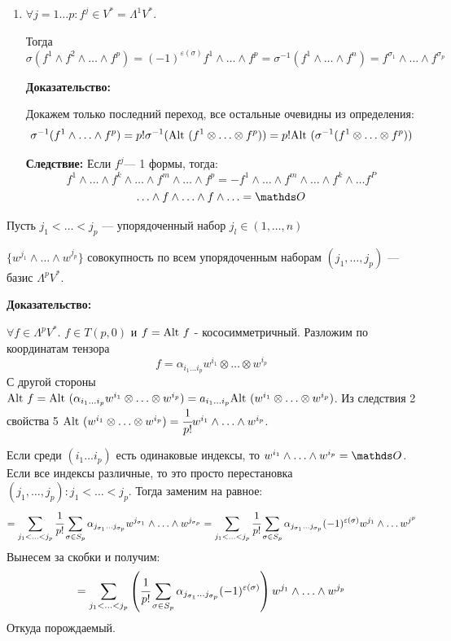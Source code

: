 \begin{enumerate}
    \item $\forall j=1\ldots p : f^j \in V^*= \Lambda^1V^*$.

    Тогда $$\sigma(f^1 \wedge f^2 \wedge \ldots\wedge  f^p) = (-1)^{\varepsilon(\sigma)}f^1\wedge \ldots \wedge f^p = \sigma^{-1}(f^1\wedge \ldots \wedge f^n) = f^{\sigma_1}\wedge \ldots \wedge f^{\sigma_p}$$

    \textbf{Доказательство:}

    Докажем только последний переход, все остальные очевидны из определения:
    $$\sigma^{-1}(f^1 \wedge \ldots \wedge f^p ) = p! \sigma^{-1}(\text{Alt } (f^1 \otimes \ldots \otimes f^p )) =p!\text{Alt } (\sigma^{-1}(f^1 \otimes \ldots \otimes f^p)) $$

    \textbf{Следствие:} Если $f^j$--- 1 формы, тогда:
    $$f^1 \wedge \ldots \wedge f^k \wedge \ldots \wedge f^m \wedge \ldots \wedge f^p = -f^1 \wedge \ldots \wedge f^m \wedge \ldots \wedge f^k \wedge \ldots f^P$$
    $$\ldots \wedge f \wedge \ldots \wedge f \wedge \ldots = \zero$$
\end{enumerate}


Пусть $j_1 < \ldots  < j_p$ --- упорядоченный набор $j_l \in (1,\ldots,n)$

$\{w^{j_1}\wedge \ldots \wedge w^{j_p}\}$ совокупность по всем упорядоченным наборам $(j_1,\ldots, j_p)$ --- базис $\Lambda^pV^*$.

\textbf{Доказательство:}


$\forall f \in \Lambda^p V^*$. $f\in T(p,0)$ и $f = \text{Alt } f$ - кососимметричный. Разложим по координатам тензора
$$f= \alpha_{i_1\ldots i_p} w^{i_1}\otimes \ldots \otimes w^{i_p}$$
С другой стороны $\text{Alt } f = \text{Alt } (\alpha_{i_1\ldots i_p}w^{i_1}\otimes  \ldots \otimes w^{i_p}) = a_{i_1\ldots i_p}\text{Alt } (w^{i_1}\otimes \ldots \otimes w^{i_p})$. Из следствия 2 свойства 5 $\text{Alt } (w^{i_1}\otimes \ldots \otimes w^{i_p}) = \cfrac{1}{p!}w^{i_1}\wedge \ldots \wedge w^{i_p}$.

Если среди $(i_1\ldots i_p)$ есть одинаковые индексы, то $w^{i_1} \wedge \ldots \wedge w^{i_p} = \zero$. Если все индексы различные, то это просто перестановка $(j_1,\ldots,j_p): j_1<\ldots <j_p$. Тогда заменим на равное:
$$=\sum_{j_1<\ldots<j_p}\cfrac{1}{p!}\sum\limits_{\sigma \in S_p} \alpha_{j_{\sigma_1}\ldots j_{\sigma_p}} w^{j_{\sigma_1}}\wedge \ldots \wedge w^{j_{\sigma_p}} = \sum_{j_1<\ldots<j_p}\cfrac{1}{p!}\sum\limits_{\sigma \in S_p} \alpha_{j_{\sigma_1}\ldots j_{\sigma_p}} (-1)^{\varepsilon(\sigma)}w^{j_1}\wedge \ldots w^{j^p}$$
Вынесем за скобки и получим:
$$=\sum_{j_1<\ldots<j_p}\left(\cfrac{1}{p!}\sum\limits_{\sigma \in S_p}\alpha_{j_{\sigma_1}\ldots j_{\sigma_p}}(-1)^{\varepsilon(\sigma)}\right)w^{j_1}\wedge \ldots \wedge w^{j_p}$$
Откуда порождаемый.

